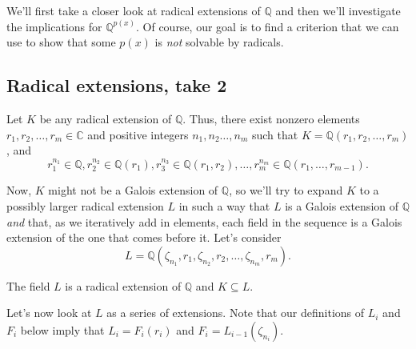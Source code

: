 We'll first take a closer look at radical extensions of $\mathbb{Q}$ and then we'll investigate the implications for $\mathbb{Q}^{p(x)}$. Of course, our goal is to find a criterion that we can use to show that some $p(x)$ is \emph{not} solvable by radicals.

\subsection{Radical extensions, take 2}
Let $K$ be any radical extension of $\mathbb{Q}$. Thus, there exist nonzero elements $r_1,r_2,\ldots,r_m\in \mathbb{C}$ and positive integers $n_1,n_2\ldots,n_m$ such that $K = \mathbb{Q}(r_1,r_2,\ldots,r_m)$, and 
\[r_1^{n_1} \in \mathbb{Q}, r_2^{n_2} \in \mathbb{Q}(r_1), r_3^{n_3} \in \mathbb{Q}(r_1,r_2), \ldots, r_m^{n_m} \in \mathbb{Q}(r_1,\ldots,r_{m-1}).\]

Now, $K$ might not be a Galois extension of  $\mathbb{Q}$, so we'll try to  expand $K$ to a possibly larger radical extension $L$ in such a way that $L$ is a Galois extension of $\mathbb{Q}$ \emph{and} that, as we iteratively add in elements, each field in the sequence is a Galois extension of the one that comes before it. Let's consider  
\[ L = \mathbb{Q}(\zeta_{n_1},r_1,\zeta_{n_2},r_2,\ldots,\zeta_{n_m},r_m).\]

\begin{lemma}
The field $L$ is a radical extension of $\mathbb{Q}$ and $K\subseteq L$.
\end{lemma}

Let's now look at $L$ as a series of extensions. Note that our definitions of $L_i$ and $F_i$ below imply that $L_i = F_i(r_i)$ and $F_i = L_{i-1}(\zeta_{n_i})$.

\begin{center}
\end{center}

